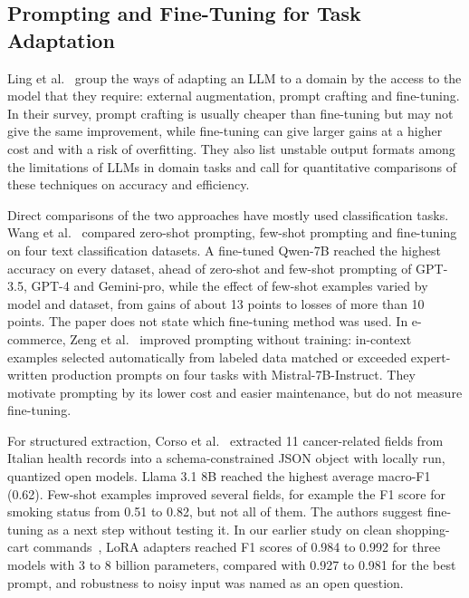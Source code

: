 \documentclass[journal,article,submit,pdftex,moreauthors]{Definitions/mdpi}
\begin{document}
\subsection{Prompting and Fine-Tuning for Task Adaptation}\label{sec:rw-adapt}

Ling et al.~\citep{ling2025domain} group the ways of adapting an LLM to a domain by the access to the model that they require: external augmentation, prompt crafting and fine-tuning. In their survey, prompt crafting is usually cheaper than fine-tuning but may not give the same improvement, while fine-tuning can give larger gains at a higher cost and with a risk of overfitting. They also list unstable output formats among the limitations of LLMs in domain tasks and call for quantitative comparisons of these techniques on accuracy and efficiency.

Direct comparisons of the two approaches have mostly used classification tasks. Wang et al.~\citep{wang2024adaptable} compared zero-shot prompting, few-shot prompting and fine-tuning on four text classification datasets. A fine-tuned Qwen-7B reached the highest accuracy on every dataset, ahead of zero-shot and few-shot prompting of GPT-3.5, GPT-4 and Gemini-pro, while the effect of few-shot examples varied by model and dataset, from gains of about 13 points to losses of more than 10 points. The paper does not state which fine-tuning method was used. In e-commerce, Zeng et al.~\citep{zeng2025examples} improved prompting without training: in-context examples selected automatically from labeled data matched or exceeded expert-written production prompts on four tasks with Mistral-7B-Instruct. They motivate prompting by its lower cost and easier maintenance, but do not measure fine-tuning.

For structured extraction, Corso et al.~\citep{corso2026clinician} extracted 11 cancer-related fields from Italian health records into a schema-constrained JSON object with locally run, quantized open models. Llama 3.1 8B reached the highest average macro-F1 (0.62). Few-shot examples improved several fields, for example the F1 score for smoking status from 0.51 to 0.82, but not all of them. The authors suggest fine-tuning as a next step without testing it. In our earlier study on clean shopping-cart commands~\citep{karlovic2026evaluating}, LoRA adapters reached F1 scores of 0.984 to 0.992 for three models with 3 to 8 billion parameters, compared with 0.927 to 0.981 for the best prompt, and robustness to noisy input was named as an open question.
\end{document}
